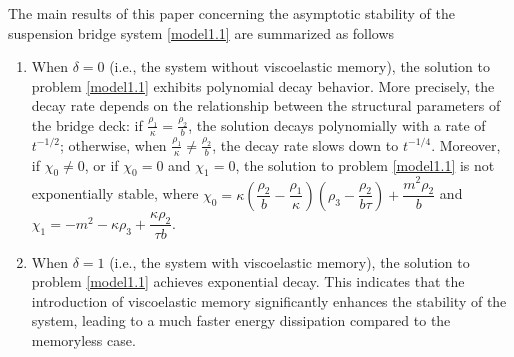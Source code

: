 \documentclass[11pt,reqno]{article}
\begin{document}
The main results of this paper concerning the asymptotic stability of the suspension bridge system \eqref{model1.1} are summarized as follows
\begin{enumerate}
  \item When $\delta = 0$ (i.e., the system without viscoelastic memory), the solution to problem \eqref{model1.1} exhibits polynomial decay behavior. More precisely, the decay rate depends on the relationship between the structural parameters of the bridge deck: if $\frac{\rho_1}{\kappa} = \frac{\rho_2}{b}$, the solution decays polynomially with a rate of $t^{-1/2}$; otherwise, when $\frac{\rho_1}{\kappa} \neq \frac{\rho_2}{b}$, the decay rate slows down to $t^{-1/4}$. Moreover, if $\chi_0 \neq 0$, or if $\chi_0 = 0$ and $\chi_1 = 0$, the solution to problem \eqref{model1.1} is not exponentially stable, where $\chi_0 = \kappa\left(\dfrac{\rho_2}{b} -  \dfrac{\rho_1}{\kappa}\right)\left(\rho_3 - \dfrac{\rho_2}{b\tau}\right) + \dfrac{m^2 \rho_2}{b}$ and $\chi_1 = -m^2 - \kappa\rho_3 + \dfrac{\kappa\rho_2}{\tau b}$.
  \item When $\delta = 1$ (i.e., the system with viscoelastic memory), the solution to problem \eqref{model1.1} achieves exponential decay. This indicates that the introduction of viscoelastic memory significantly enhances the stability of the system, leading to a much faster energy dissipation compared to the memoryless case.
\end{enumerate}
\end{document}
